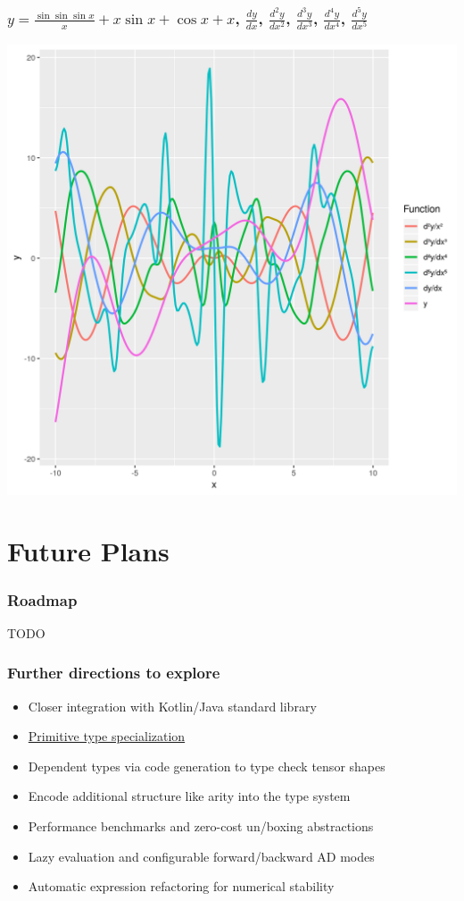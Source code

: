\documentclass{beamer}
\begin{document}
    \begin{frame}
        \frametitle{$y = \frac{\sin{\sin{\sin{x}}}}{x} + x \sin{x} + \cos{x} + x$, $\frac{dy}{dx}$, $\frac{d^{2}y}{dx^2}$, $\frac{d^{3}y}{dx^3}$, $\frac{d^{4}y}{dx^4}$, $\frac{d^{5}y}{dx^5}$}
        \begin{center}
            \includegraphics[scale=0.4]{plot.png}
        \end{center}
    \end{frame}

    \section{Future Plans}\label{sec:fifth-section}

    \begin{frame}
        \frametitle{Roadmap}
        \item TODO
    \end{frame}

    \begin{frame}
        \frametitle{Further directions to explore}
        \begin{itemize}
            \item Closer integration with Kotlin/Java standard library
            \item \href{https://discuss.kotlinlang.org/t/primitive-type-specialization/11022/4}{Primitive type specialization}
            \item Dependent types via code generation to type check tensor shapes
            \item Encode additional structure like arity into the type system
            \item Performance benchmarks and zero-cost un/boxing abstractions
            \item Lazy evaluation and configurable forward/backward AD modes
            \item Automatic expression refactoring for numerical stability
        \end{itemize}
    \end{frame}
\end{document}
